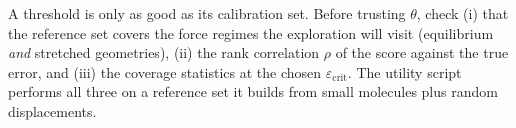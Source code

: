\begin{readbox}
A threshold is only as good as its calibration set.  Before trusting
$\theta$, check (i) that the reference set covers the force regimes the
exploration will visit (equilibrium \emph{and} stretched geometries),
(ii) the rank correlation $\rho$ of the score against the true error, and
(iii) the coverage statistics at the chosen
$\varepsilon_{\mathrm{crit}}$.  The utility script
 performs all three on a reference set it builds from
small molecules plus random displacements.
\end{readbox}
